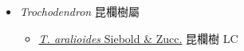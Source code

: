 
  \begin{itemize}
 \item[] \textit{Trochodendron} 昆欄樹屬
                                
  \begin{itemize}
        \item[] \href{http://www.theplantlist.org/tpl1.1/search?q=Trochodendron+aralioides}{\textit{T. aralioides} Siebold \& Zucc.}   昆欄樹   LC
  \end{itemize}
  \end{itemize}
